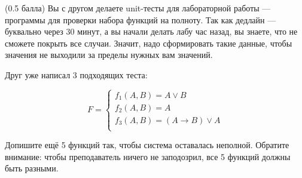 \question
(0.5 балла) Вы с другом делаете unit-тесты для лабораторной работы — программы для проверки набора функций на полноту. Так как дедлайн — буквально через 30 минут, а вы начали делать лабу час назад, вы знаете, что не сможете покрыть все случаи. Значит, надо сформировать такие данные, чтобы значения не выходили за пределы нужных вам значений.

Друг уже написал 3 подходящих теста:

\begin{equation*}
    F=
    \begin{cases}
        f_1(A,B)=A \lor B\\
        f_2(A,B)=A\\
        f_3(A,B)=(A \rightarrow B) \lor A\\
    \end{cases}
\end{equation*}
    
Допишите ещё 5 функций так, чтобы система оставалась неполной. Обратите внимание: чтобы преподаватель ничего не заподозрил, все 5 функций должны быть разными.